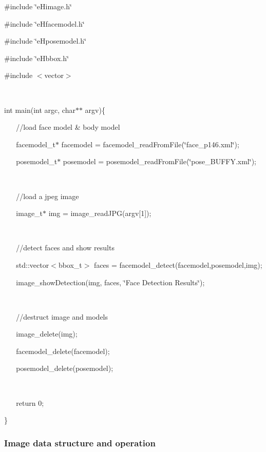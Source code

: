  
\begin{DoxyEnumerate}
\item \#include \char`\"{}e\-Himage.\-h\char`\"{}  
\item \#include \char`\"{}e\-Hfacemodel.\-h\char`\"{}  
\item \#include \char`\"{}e\-Hposemodel.\-h\char`\"{}  
\item \#include \char`\"{}e\-Hbbox.\-h\char`\"{}  
\item \#include $<$vector$>$  
\item ~  
\item int main(int argc, char$\ast$$\ast$ argv)\{  
\item ~ ~ //load face model \& body model  
\item ~ ~ facemodel\-\_\-t$\ast$ facemodel = facemodel\-\_\-read\-From\-File(\char`\"{}face\-\_\-p146.\-xml\char`\"{});  
\item ~ ~ posemodel\-\_\-t$\ast$ posemodel = posemodel\-\_\-read\-From\-File(\char`\"{}pose\-\_\-\-B\-U\-F\-F\-Y.\-xml\char`\"{});  
\item ~  
\item ~ ~ //load a jpeg image  
\item ~ ~ image\-\_\-t$\ast$ img = image\-\_\-read\-J\-P\-G(argv\mbox{[}1\mbox{]});  
\item ~ ~   
\item ~ ~ //detect faces and show results  
\item ~ ~ std\-:\-:vector$<$bbox\-\_\-t$>$ faces = facemodel\-\_\-detect(facemodel,posemodel,img);  
\item ~ ~ image\-\_\-show\-Detection(img, faces, \char`\"{}\-Face Detection Results\char`\"{});  
\item ~ ~   
\item ~ ~ //destruct image and models  
\item ~ ~ image\-\_\-delete(img);  
\item ~ ~ facemodel\-\_\-delete(facemodel);  
\item ~ ~ posemodel\-\_\-delete(posemodel);  
\item ~  
\item ~ ~ return 0;  
\item \}  
\end{DoxyEnumerate}\subsubsection*{Image data structure and operation}

 

